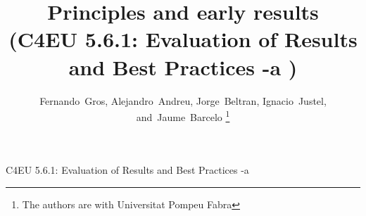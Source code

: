 \documentclass[draftclsnofoot,12pt,journal,onecolumn]{IEEEtran}
\begin{document}
%
\title{Principles and early results \\ (C4EU 5.6.1: Evaluation of Results and Best Practices -a )}
%
%
%

\author{
	Fernando~Gros, %
	Alejandro~Andreu, %
	Jorge~Beltran, %
	Ignacio~Justel, %
    and~Jaume~Barcelo%
\thanks{
The authors are with Universitat Pompeu Fabra
}
}


% 
%



%
{C4EU 5.6.1: Evaluation of Results and Best Practices -a}
% 
\end{document}
